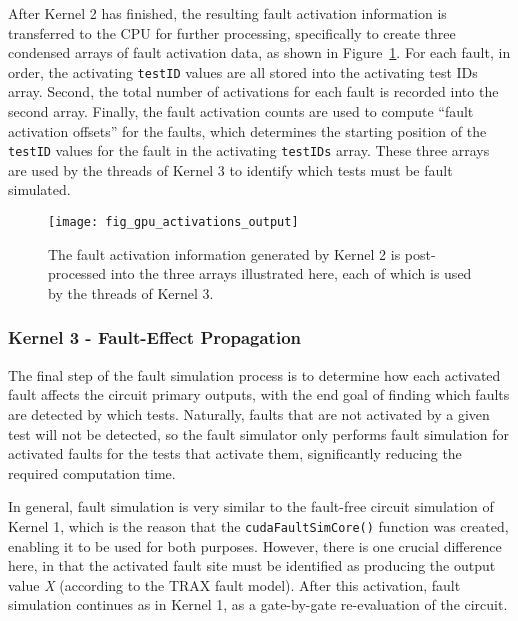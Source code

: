 After Kernel 2 has finished, the resulting fault activation information is transferred to the CPU for further processing, specifically to create three condensed arrays of fault activation data, as shown in Figure~\ref{fig:trax_gpu_activations_output}.
%
For each fault, in order, the activating \verb+testID+ values are all stored into the activating test IDs array.
%
Second, the total number of activations for each fault is recorded into the second array.
%
Finally, the fault activation counts are used to compute ``fault activation offsets'' for the faults, which determines the starting position of the \verb+testID+ values for the fault in the activating \verb+testIDs+ array.
%
These three arrays are used by the threads of Kernel 3 to identify which tests must be fault simulated.

\begin{figure}[hbtp]
\centering
\texttt{[image: fig\_gpu\_activations\_output]}
\caption{The fault activation information generated by Kernel 2 is post-processed into the three arrays illustrated here, each of which is used by the threads of Kernel 3.}
\label{fig:trax_gpu_activations_output}
\end{figure}

\subsubsection{Kernel 3 - Fault-Effect Propagation}
\label{sec:trax_gpu_k3}

The final step of the fault simulation process is to determine how each activated fault affects the circuit primary outputs, with the end goal of finding which faults are detected by which tests.
%
Naturally, faults that are not activated by a given test will not be detected, so the fault simulator only performs fault simulation for activated faults for the tests that activate them, significantly reducing the required computation time.

In general, fault simulation is very similar to the fault-free circuit simulation of Kernel 1, which is the reason that the \verb+cudaFaultSimCore()+ function was created, enabling it to be used for both purposes.
%
However, there is one crucial difference here, in that the activated fault site must be identified as producing the output value \textit{X} (according to the TRAX fault model).
%
After this activation, fault simulation continues as in Kernel 1, as a gate-by-gate re-evaluation of the circuit.

